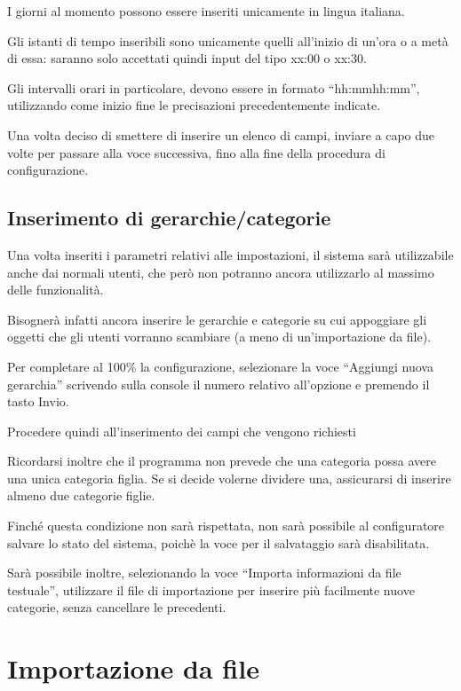 I giorni al momento possono essere inseriti unicamente in lingua italiana.

Gli istanti di tempo inseribili sono unicamente quelli all'inizio di un'ora o a metà di essa: saranno solo accettati quindi input del tipo xx:00 o xx:30.

Gli intervalli orari in particolare, devono essere in formato ``hh:mm\textendash hh:mm'', utilizzando come inizio fine le precisazioni precedentemente indicate.

Una volta deciso di smettere di inserire un elenco di campi, inviare a capo due volte per passare alla voce successiva, fino alla fine della procedura di configurazione.

\subsection{Inserimento di gerarchie/categorie}

Una volta inseriti i parametri relativi alle impostazioni, il sistema sarà utilizzabile anche dai normali utenti, che però non potranno ancora utilizzarlo al massimo delle funzionalità.

Bisognerà infatti ancora inserire le gerarchie e categorie su cui appoggiare gli oggetti che gli utenti vorranno scambiare (a meno di un'importazione da file).

Per completare al 100\% la configurazione, selezionare la voce ``Aggiungi nuova gerarchia'' scrivendo sulla console il numero relativo all'opzione e premendo il tasto Invio.

Procedere quindi all'inserimento dei campi che vengono richiesti 

Ricordarsi inoltre che il programma non prevede che una categoria possa avere una unica categoria figlia. Se si decide volerne dividere una, assicurarsi di inserire almeno due categorie figlie.

Finché questa condizione non sarà rispettata, non sarà possibile al configuratore salvare lo stato del sistema, poichè la voce per il salvataggio sarà disabilitata.

Sarà possibile inoltre, selezionando la voce ``Importa informazioni da file testuale'', utilizzare il file di importazione per inserire più facilmente nuove categorie, senza cancellare le precedenti.

\pagebreak
\section{Importazione da file}
\lstset{style=mystyle}

